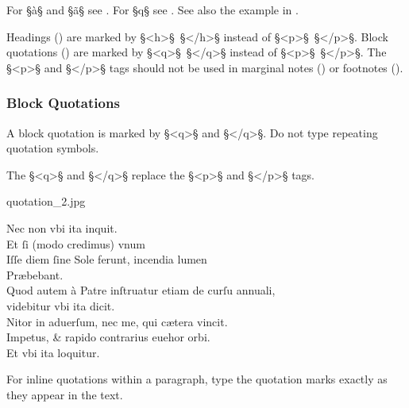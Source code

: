 \begin{crossref}
For  §à§ and §ã§ see . For  §\´q§ see . See also the example in .
\end{crossref}

\begin{note}
Headings () are marked by §<h>§~§</h>§ instead of §<p>§~§</p>§. Block quotations  () are marked by §<q>§~§</q>§ instead of §<p>§~§</p>§. The §<p>§ and §</p>§ tags should not be used in marginal notes () or footnotes ().
\end{note}


\subsubsection{Block Quotations}
\label{section block quotations}

\begin{mainrule}
A block quotation is marked by §<q>§ and §</q>§. Do not type repeating quotation symbols.
\end{mainrule}

\begin{clarification}
The §<q>§ and §</q>§ replace the §<p>§ and §</p>§ tags.
\end{clarification}

\begin{sampleImage}{quotation_2.jpg}
\begin{typeLatin}
Nec non vbi ita inquit.\\
Et ſi (modo credimus) vnum\\
Iſſe diem ſine Sole ferunt, incendia lumen\\
Præbebant.\\
Quod autem à Patre inſtruatur etiam de curſu annuali,\\
videbitur vbi ita dicit.\\
Nitor in aduerſum, nec me, qui cætera vincit.\\
Impetus, & rapido contrarius euehor orbi. \\
Et vbi ita loquitur.
\end{typeLatin}
\end{sampleImage}

\begin{note}
For inline quotations within a paragraph, type the quotation marks exactly as they appear in the text.
\end{note}


